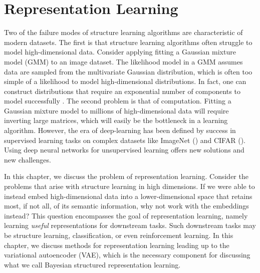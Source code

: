 \chapter{Representation Learning}

Two of the failure modes of structure learning
algorithms are
characteristic
of modern datasets.
The first is that structure learning
algorithms often struggle to 
model high-dimensional data.
Consider applying
fitting a Gaussian mixture
model (GMM) to an image dataset.
The likelihood model in a GMM
assumes data are sampled
from the multivariate Gaussian
distribution, which is
often too simple of a likelihood
to model high-dimensional distributions.
In fact, one can construct
distributions that require an
exponential number of components
to model successfully \cite{TODO}.
The second problem
is that of computation.
Fitting a Gaussian mixture model
to millions of high-dimensional data
will require inverting
large matrices, which will
easily be the bottleneck in a
learning algorithm.
However, the era of deep-learning has
been defined by success in supervised learning
tasks on
complex datasets
like ImageNet (\citep{Deng2009}) and CIFAR (\citep{CIFAR}).
Using deep neural networks for
unsupervised learning offers
new solutions and
new challenges.

In this chapter, we discuss the problem
of representation learning.
Consider the problems that arise 
with structure learning in high dimensions.
If we were able to instead embed 
high-dimensional data into a lower-dimensional space
that retains most, if not all,
of its semantic information,
why not work with the embeddings instead?
This question encompasses the goal
of representation learning, namely
learning \emph{useful} representations
for downstream tasks.
Such downstream tasks may
be structure learning, classification,
or even reinforcement learning.
In this chapter, we
discuss methods for representation learning
leading up to the variational autoencoder (VAE),
which is the necessary component
for discussing what we call Bayesian structured representation learning.

